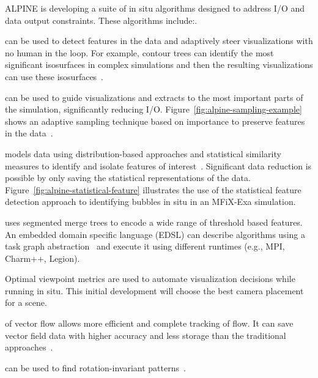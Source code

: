 ALPINE is developing a suite of in situ  algorithms designed to address I/O and data output constraints.   These algorithms include:.  
\begin{description}  
	\setlength{\itemsep}{1pt}
    \setlength{\parskip}{0pt}
    \setlength{\parsep}{0pt}
	\item [Topological analysis] can be used to detect features in the data and adaptively steer visualizations with no human in the loop.  For example, contour trees can identify the most significant isosurfaces in complex simulations and then the resulting visualizations can use these isosurfaces~\cite{alpine:Carr:TVCG19}.
	\item [Adaptive sampling]  can be used to guide visualizations and extracts to the most important parts of the simulation, significantly reducing I/O.  Figure~\ref{fig:alpine-sampling-example} shows an adaptive sampling technique based on importance to preserve  features in the data~\cite{alpine:Biswas:ISAV18,alpine:Dutta:Entropy19,alpine:Liu:SC19poster}.
	\item [Statistical feature detection] models data using distribution-based approaches and statistical similarity measures to identify and isolate features of interest~\cite{alpine:Dutta:PVIS17,alpine:Dutta:VIS15}. Significant data reduction is possible by only saving the statistical representations of the data.  Figure~\ref{fig:alpine-statistical-feature} illustrates the use of the statistical feature detection approach to identifying bubbles in situ in an MFiX-Exa simulation.  
	\item [Task-based feature extraction] uses segmented merge trees to encode a wide range of threshold based features.  An embedded domain specific language (EDSL) can describe algorithms using a  task graph abstraction~\cite{alpine:Landge:SC14,alpine:Petruzza:IPDPS18} and execute it using different runtimes (e.g., MPI, Charm++, Legion).
	\item [Optimal Viewpoint] Optimal viewpoint metrics are used to automate visualization decisions while running in situ.  This initial development will choose the best camera placement for a scene.  
	\item [Lagrangian analysis] of vector flow allows more efficient and complete tracking of flow.  It can save vector field data with higher accuracy and less storage than the traditional approaches~\cite{alpine:Sane:EGPGV18,alpine:Sane:EGPGV19,alpine:Binyahib:LDAV19}.
	\item [Moments-based pattern detection] can be used to find rotation-invariant patterns~\cite{alpine:Bujack:WSCG17,alpine:Yang:PR17,alpine:Wang:TopoVis17}. 
\end{description}

